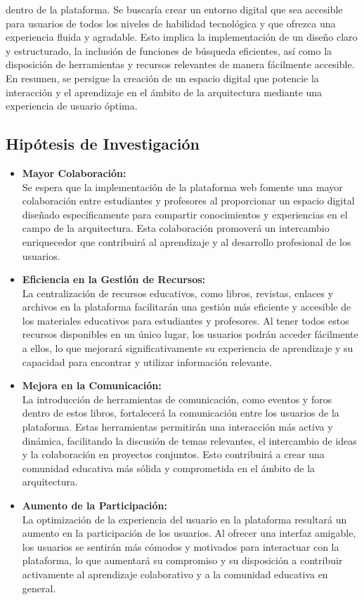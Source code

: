 \documentclass[a4paper, 12pt]{book}
\begin{document}
\begin{itemize}
  dentro de la plataforma. Se buscaría crear un entorno digital que sea accesible para usuarios de todos los niveles de habilidad tecnológica y que ofrezca 
  una experiencia fluida y agradable. Esto implica la implementación de un diseño claro y estructurado, la inclusión de funciones de búsqueda eficientes, 
  así como la disposición de herramientas y recursos relevantes de manera fácilmente accesible. \\ En resumen, se persigue la creación de un espacio digital 
  que potencie la interacción y el aprendizaje en el ámbito de la arquitectura mediante una experiencia de usuario óptima.
\end{itemize}

\subsection{Hipótesis de Investigación}
\label{subsec:Hipotesis de Investigacin}

\begin{itemize}
  \item \textbf{Mayor Colaboración:} \\ 
  Se espera que la implementación de la plataforma web fomente una mayor colaboración entre estudiantes y profesores al proporcionar un espacio digital diseñado 
  específicamente para compartir conocimientos y experiencias en el campo de la arquitectura. Esta colaboración promoverá un intercambio enriquecedor que contribuirá 
  al aprendizaje y al desarrollo profesional de los usuarios.
  \item \textbf{Eficiencia en la Gestión de Recursos:} \\ La centralización de recursos educativos, como libros, revistas, enlaces y archivos en la plataforma 
  facilitarán una gestión más eficiente y accesible de los materiales educativos para estudiantes y profesores. Al tener todos estos recursos disponibles en un único 
  lugar, los usuarios podrán acceder fácilmente a ellos, lo que mejorará significativamente su experiencia de aprendizaje y su capacidad para encontrar y utilizar 
  información relevante.
  \item \textbf{Mejora en la Comunicación:}\\ La introducción de herramientas de comunicación, como eventos y foros dentro de estos libros, fortalecerá la 
  comunicación entre los usuarios de la plataforma. Estas herramientas permitirán una interacción más activa y dinámica, facilitando la discusión de temas relevantes, 
  el intercambio de ideas y la colaboración en proyectos conjuntos. Esto contribuirá a crear una comunidad educativa más sólida y comprometida en el ámbito de la 
  arquitectura.
  \item \textbf{Aumento de la Participación:} \\La optimización de la experiencia del usuario en la plataforma resultará un aumento en la participación de los 
  usuarios. Al ofrecer una interfaz amigable, los usuarios se sentirán más cómodos y motivados para interactuar con la plataforma, lo que aumentará su compromiso 
  y su disposición a contribuir activamente al aprendizaje colaborativo y a la comunidad educativa en general.
\end{itemize}
\end{document}
